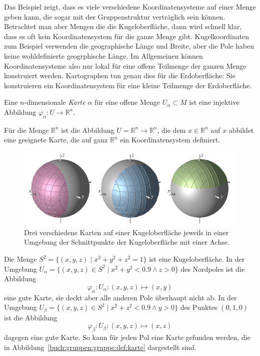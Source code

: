 Das Beispiel zeigt, dass es viele verschiedene Koordinatensysteme
auf einer Menge geben kann, die sogar mit der Gruppenstruktur verträglich
sein können.
Betrachtet man aber Mengen die die Kugeloberfläche, dann wird schnell
klar, dass es oft kein Koordinatensystem für die ganze Menge gibt.
Kugelkoordinaten zum Beispiel verwenden die geographische Länge und 
Breite, aber die Pole haben keine wohldefinierte geogrphische Länge.
Im Allgemeinen können Koordinatensysteme also nur lokal für eine offene
Teilmenge der ganzen Menge konstruiert werden.
Kartographen tun genau dies für die Erdoberfläche: Sie konstruieren
ein Koordinatensystem für eine kleine Teilmenge der Erdoberfläche.

\begin{definition}
\label{buch:gruppen:gruppe:def:karte}
Eine $n$-dimensionale {\em Karte} $\alpha$ für eine offene Menge
$U_\alpha\subset M$ ist eine injektive Abbildung
$\varphi_\alpha\colon U\to \mathbb{R}^n$.
\end{definition}

\begin{beispiel}
Für die Menge $\mathbb{R}^n$ ist die Abbildung
$U=\mathbb{R}^n\to \mathbb{R}^n$, die dem $x\in\mathbb{R}^n$ auf
$x$ abbildet eine geeignete Karte, die auf ganz $\mathbb{R}^n$ ein
Koordinatensystem definiert.
\end{beispiel}

\begin{beispiel}
\label{buch:gruppen:gruppe:bsp:kugel}
\begin{figure}
\centering
\includegraphics{chapters/030-gruppen/images/kugelkarten.pdf}
\caption{Drei verschiedene Karten auf einer Kugeloberfläche jeweils in
einer Umgebung der Schnittpunkte der Kugeloberfläche mit einer
Achse.
\label{buch:gruppen:gruppe:fig:kugelkarten}}
\end{figure}
Die Menge $S^2 = \{(x,y,z)\mid x^2+y^2+z^2=1\}$ ist eine Kugeloberfläche.
In der Umgebung $U_\alpha = \{(x,y,z)\in S^2\mid x^2+y^2<0.9\wedge z>0\}$
des Nordpoles ist die Abbildung
\[
\varphi_\alpha
\colon
U_\alpha
:
(x,y,z)\mapsto (x,y)
\]
eine gute Karte, sie deckt aber alle anderen Pole überhaupt nicht ab.
In der Umgebung $U_\beta = \{(x,y,z)\in S^2\mid x^2+z^2<0.9\wedge y>0\}$
des Punktes $(0,1,0)$ ist die Abbildung
\[
\varphi_\beta
\colon
U_\beta
:
(x,y,z)\mapsto (x,z)
\]
dagegen eine gute Karte.
So kann für jeden Pol eine Karte gefunden werden, die in 
Abbildung~\ref{buch:gruppen:gruppe:def:karte} dargestellt sind.
\end{beispiel}

